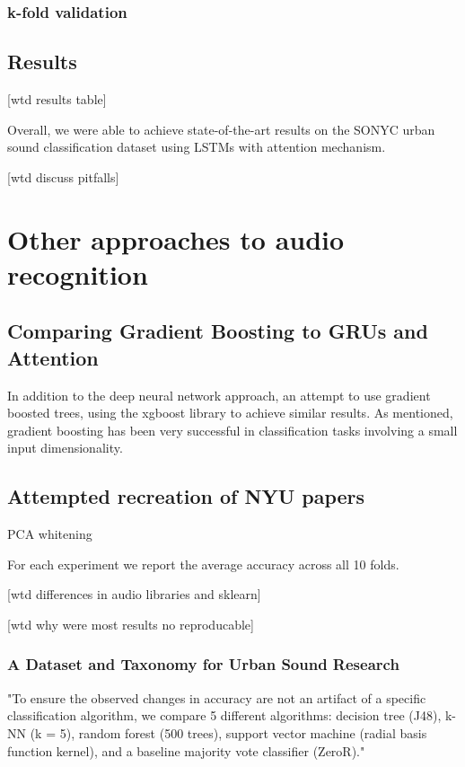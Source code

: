 \subsection{k-fold validation}

\section{Results}

[wtd results table]

Overall, we were able to achieve state-of-the-art results on the SONYC urban sound classification dataset using LSTMs with attention mechanism.

[wtd discuss pitfalls]

\chapter{Other approaches to audio recognition}
\section{Comparing Gradient Boosting to GRUs and Attention}

In addition to the deep neural network approach, an attempt to use gradient boosted trees, using the xgboost library \cite{DBLP:journals/corr/ChenG16} to achieve similar results.  As mentioned, gradient boosting has been very successful in classification tasks involving a small input dimensionality.

\section{Attempted recreation of NYU papers}

PCA whitening

For each experiment we report the average accuracy across all 10 folds.

[wtd differences in audio libraries and sklearn]

[wtd why were most results no reproducable]



\subsection{A Dataset and Taxonomy for Urban Sound Research}

"To ensure
the observed changes in accuracy are not an artifact of a
specific classification algorithm, we compare 5 different algorithms:
decision tree (J48), k-NN (k = 5), random forest
(500 trees), support vector machine (radial basis function
kernel), and a baseline majority vote classifier (ZeroR)."

